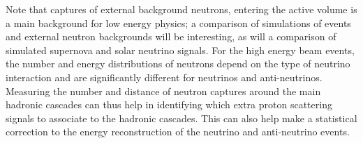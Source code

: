 Note that captures of external background neutrons, entering the active volume is a main background for low energy physics; a comparison of simulations of  events and external neutron backgrounds will be interesting, as will a comparison of simulated supernova and solar neutrino signals. 
For the high energy beam events, the number and energy distributions of neutrons depend on the type of neutrino interaction and are significantly different for neutrinos and anti-neutrinos. Measuring the number and distance of neutron captures around the main hadronic cascades can thus help in identifying which extra proton scattering signals to associate to the hadronic cascades. This can also help make a statistical correction to the energy reconstruction of the neutrino and anti-neutrino events.



